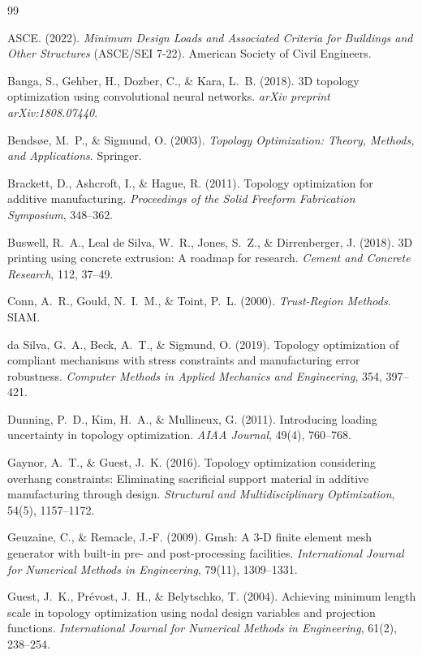 \documentclass[11pt]{article}
\theoremstyle{plain}
\theoremstyle{definition}
\theoremstyle{remark}
\begin{document}
\begin{thebibliography}{99}

ASCE. (2022). \emph{Minimum Design Loads and Associated Criteria for Buildings and Other Structures} (ASCE/SEI 7-22). American Society of Civil Engineers.

Banga, S., Gehber, H., Dozber, C., \& Kara, L.~B. (2018). 3D topology optimization using convolutional neural networks. \emph{arXiv preprint arXiv:1808.07440}.

Bendsøe, M.~P., \& Sigmund, O. (2003). \emph{Topology Optimization: Theory, Methods, and Applications}. Springer.

Brackett, D., Ashcroft, I., \& Hague, R. (2011). Topology optimization for additive manufacturing. \emph{Proceedings of the Solid Freeform Fabrication Symposium}, 348--362.

Buswell, R.~A., Leal de Silva, W.~R., Jones, S.~Z., \& Dirrenberger, J. (2018). 3D printing using concrete extrusion: A roadmap for research. \emph{Cement and Concrete Research}, 112, 37--49.

Conn, A.~R., Gould, N.~I.~M., \& Toint, P.~L. (2000). \emph{Trust-Region Methods}. SIAM.

da Silva, G.~A., Beck, A.~T., \& Sigmund, O. (2019). Topology optimization of compliant mechanisms with stress constraints and manufacturing error robustness. \emph{Computer Methods in Applied Mechanics and Engineering}, 354, 397--421.

Dunning, P.~D., Kim, H.~A., \& Mullineux, G. (2011). Introducing loading uncertainty in topology optimization. \emph{AIAA Journal}, 49(4), 760--768.

Gaynor, A.~T., \& Guest, J.~K. (2016). Topology optimization considering overhang constraints: Eliminating sacrificial support material in additive manufacturing through design. \emph{Structural and Multidisciplinary Optimization}, 54(5), 1157--1172.

Geuzaine, C., \& Remacle, J.-F. (2009). Gmsh: A 3-D finite element mesh generator with built-in pre- and post-processing facilities. \emph{International Journal for Numerical Methods in Engineering}, 79(11), 1309--1331.

Guest, J.~K., Prévost, J.~H., \& Belytschko, T. (2004). Achieving minimum length scale in topology optimization using nodal design variables and projection functions. \emph{International Journal for Numerical Methods in Engineering}, 61(2), 238--254.


\end{thebibliography}
\end{document}
